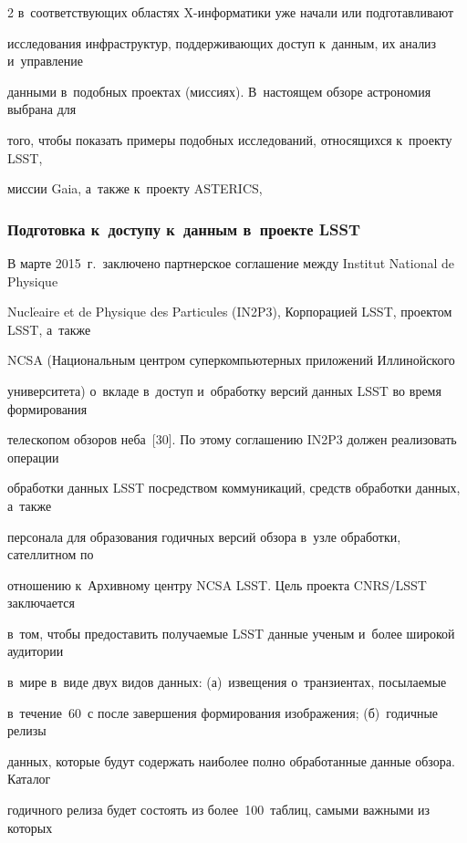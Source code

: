 \begin{multicols}{2}
в~соответствующих областях X-ин\-фор\-ма\-ти\-ки уже начали или подготавливают 


исследования инфраструктур, поддерживающих доступ к~данным, их анализ и~управ\-ле\-ние 


данными в~подобных проектах (миссиях). В~настоящем обзоре астрономия выбрана для 


того, чтобы показать примеры подобных исследований, относящихся к~проекту LSST, 


миссии Gaia, а~также к~проекту ASTERICS,





\subsubsection{Подготовка к~доступу к~данным в~проекте LSST}





  В марте 2015~г.\ заключено партнерское соглашение между Institut National de Physique 


Nucl$\acute{\mbox{e}}$aire et de Physique des Particules (IN2P3), Корпорацией LSST, проектом LSST, а~также 


NCSA (Национальным центром суперкомпьютерных приложений Иллинойского 


университета) о~вкладе в~доступ и~обработку версий данных LSST во время формирования 


телескопом обзоров неба~[30]. По этому соглашению IN2P3 должен реализовать операции 


обработки данных LSST посредством коммуникаций, средств обработки данных, а~так\-же 


персонала для образования годичных версий обзора в~узле обработки, сателлитном по 


отношению к~Архивному центру NCSA LSST. Цель проекта CNRS/LSST заключается 


в~том, чтобы предоставить получаемые LSST данные ученым и~более широкой аудитории 


в~мире в~виде двух видов данных: (а)~извещения о~транзиентах, посылаемые 


в~течение~60~с после завершения формирования изображения; (б)~годичные релизы 


данных, которые будут содержать наиболее полно обработанные данные обзора. Каталог\linebreak 


годичного релиза будет состоять из более~100~таб\-лиц, самыми важными из которых 



\end{multicols}
